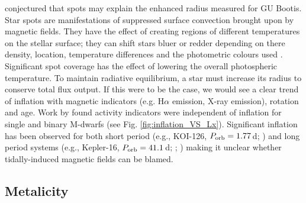 \citet{2005ApJ...631.1120L} conjectured that spots may explain the enhanced radius measured for GU Bootis. Star spots are manifestations of suppressed surface convection brought upon by magnetic fields. They have the effect of creating regions of different temperatures on the stellar surface; they can shift stars bluer or redder depending on there density, location, temperature differences and the photometric colours used \citep{2013ApJ...779..183F}. Significant spot coverage has the effect of lowering the overall photospheric temperature. To maintain radiative equilibrium, a star must increase its radius to conserve total flux output.  If this were to be the case, we would see a clear trend of inflation with magnetic indicators (e.g. H$\alpha$ emission, X-ray emission), rotation and age. Work by \citet{2013ApJ...776...87S} found activity indicators were independent of inflation for single and binary M-dwarfs (see Fig. \ref{fig:inflation_VS_Lx}). Significant inflation has been observed for both short period (e.g., KOI-126, $P_{\rm orb} = 1.77$\,d; \citealt{2011Sci...331..562C}) and long period systems (e.g., Kepler-16, $P_{\rm orb} = 41.1$\,d; \citealt{2011Sci...333.1602D}; \citealt{2011ApJ...737L..18W}) making it unclear whether tidally-induced magnetic fields can be blamed. 
        

\subsection{Metalicity}

